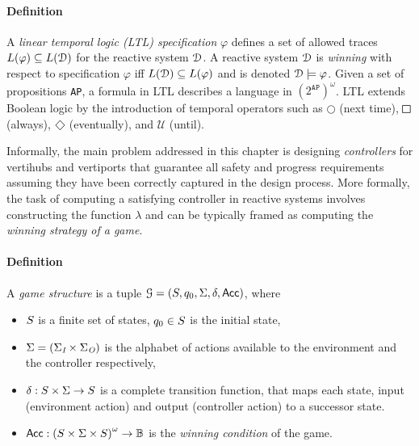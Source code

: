 \paragraph*{\textbf{Definition}}
%
A \emph{linear temporal logic (LTL) specification} $\varphi$ defines a set of allowed traces $L(\varphi) \subseteq L(\mathcal{D})$ for the reactive system $\mathcal{D}$.  A reactive system $\mathcal{D}$ is \emph{winning} with respect to specification $\varphi$ iff $L(\mathcal{D}) \subseteq L(\varphi)$ and is denoted $\mathcal{D} \models \varphi$. Given a set of propositions \texttt{AP}, a formula in LTL describes a language in $(2^{\texttt{AP}})^\omega$. LTL extends Boolean logic by the introduction of temporal operators such as $\bigcirc$ (next time), $\LTLglobally$ (always), $\LTLfinally$ (eventually), and $\mathcal{U}$ (until). 


 Informally, the main problem addressed in this chapter is designing \emph{controllers} for vertihubs and vertiports that guarantee all safety and progress requirements assuming they have been correctly captured in the design process. More formally, the task of computing a satisfying controller in reactive systems involves constructing the function $\lambda$ and can be typically framed as computing the \emph{winning strategy of a game}. 



\paragraph*{\textbf{Definition}}
%
A \emph{game structure} is a tuple 
$\mathcal{G} = (S, q_0, \Sigma, \delta,\mathsf{Acc})$,
where 
\begin{itemize}
\item $S$ is a finite set of states, $q_0 \in S$ is the initial state,
\item $\Sigma = (\Sigma_{\textit{I}} \times \Sigma_{\textit{O}})$ is the alphabet of actions available to the environment and the controller respectively, 
\item $\delta: S \times \Sigma \rightarrow S$
is a complete transition function, that maps each state, input (environment action) and output (controller action) to a successor state.
\item $\mathsf{Acc}: \left(S \times \Sigma \times S\right)^\omega \rightarrow \mathbb{B}$ is the \emph{winning condition} of the game. 
\end{itemize}


